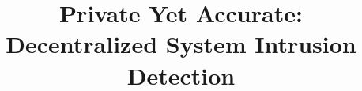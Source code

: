 \documentclass[conference]{IEEEtran}
\begin{document}
\title{Private Yet Accurate: Decentralized System Intrusion Detection}

\maketitle


% 
% 


% 


% 



% 


% 
% 

% 
% 
% 

\balance

{
\footnotesize
\setlength{\bibsep}{3pt}
}

\end{document}
